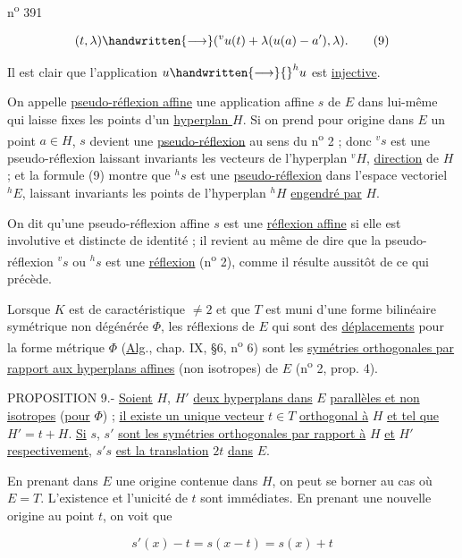 
n\textsuperscript{o} 391

\[
(t,\lambda)\handwritten{\longrightarrow}({}^{v}u(t)+\lambda(u(a)-a'),\lambda).\tag*{(9)}
\]

Il est clair que l'application $u\handwritten{\longrightarrow}{}^{h}u$ est \uline{injective}.

On appelle \uline{pseudo-réflexion affine} une application affine $s$ de $E$ dans lui-même qui laisse fixes les points d'un \uline{hyperplan } $H$. Si on prend pour origine dans $E$ un point $a\in H$, $s$ devient une \uline{pseudo-réflexion} au sens du n\textsuperscript{o} 2 ; donc $^{v}s$ est une pseudo-réflexion laissant invariants les vecteurs de l'hyperplan $^{v}H$, \uline{direction} de $H$ ; et la formule (9) montre que $^{h}s$ est une \uline{pseudo-réflexion} dans l'espace vectoriel $^{h}E$, laissant invariants les points de l'hyperplan $^{h}H$ \uline{engendré par} $H$.

On dit qu'une pseudo-réflexion affine $s$ est une \uline{réflexion affine} si elle est involutive et distincte de identité ; il revient au même de dire que la pseudo-réflexion $^{v}s$ ou $^{h}s$ est une \uline{réflexion} (n\textsuperscript{o} 2), comme il résulte aussitôt de ce qui précède.

Lorsque $K$ est de caractéristique $\neq2$ et que $T$ est muni d'une forme bilinéaire symétrique non dégénérée $\Phi$, les réflexions de $E$ qui sont des \uline{déplacements} pour la forme métrique $\Phi$ (\uline{Alg}., chap. IX, §6, n\textsuperscript{o} 6) sont les \uline{symétries orthogonales par rapport aux hyperplans affines} (non isotropes) de $E$ (n\textsuperscript{o} 2, prop. 4).

\margin{\handwritten{\unsure{/}}}

\margin{\handwritten{\unsure{!}}}

PROPOSITION 9.- \uline{Soient} $H$, $H'$ \uline{deux hyperplans dans} $E$ \uline{parallèles et non isotropes} (\uline{pour} $\Phi$) ; \uline{il existe un unique vecteur} $t\in T$ \uline{orthogonal à} $H$ \uline{et tel que} $H'=t+H$. \uline{Si} $s$, $s'$ \uline{sont les symétries orthogonales par rapport à} $H$ \uline{et} $H'$ \uline{respectivement}, $s's$ \uline{est la translation} $2t$ \uline{dans} $E$.

En prenant dans $E$ une origine contenue dans $H$, on peut se borner au cas où $E=T$. L'existence et l'unicité de $t$ sont immédiates. En prenant une nouvelle origine au point $t$, on voit que

\[
s'(x)-t=s(x-t)=s(x)+t
\]


